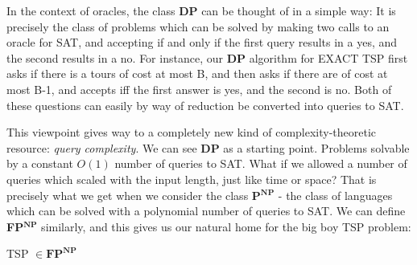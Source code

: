 \par In the context of oracles, the class \textbf{DP} can be thought of in a simple way: It is precisely the class of problems which can be solved by making two calls to an oracle for SAT, and accepting if and only if the first query results in a yes, and the second results in a no. For instance, our \textbf{DP} algorithm for EXACT TSP first asks if there is a tours of cost at most B, and then asks if there are of cost at most B-1, and accepts iff the first answer is yes, and the second is no. Both of these questions can easily by way of reduction be converted into queries to SAT. 
\par This viewpoint gives way to a completely new kind of complexity-theoretic resource: \textit{query complexity}. We can see \textbf{DP} as a starting point. Problems solvable by a constant $O(1)$ number of queries to SAT. What if we allowed a number of queries which scaled with the input length, just like time or space? That is precisely what we get when we consider the class \textbf{P}$^{\textbf{NP}}$ - the class of languages which can be solved with a polynomial number of queries to SAT. We can define \textbf{FP}$^{\textbf{NP}}$ similarly, and this gives us our natural home for the big boy TSP problem:
\begin{fact}
    TSP $\in \textbf{FP}^{\textbf{NP}}$ 
\end{fact}
